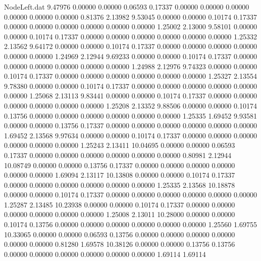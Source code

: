 \begin{filecontents}{NodeLeft.dat}
   9.47976    0.00000    0.00000     0.06593    0.17337    0.00000    0.00000    0.00000    0.00000    0.00000    0.00000    0.81376    2.13982
   9.53045    0.00000    0.00000     0.10174    0.17337    0.00000    0.00000    0.00000    0.00000    0.00000    0.00000    1.25002    2.13000
   9.58101    0.00000    0.00000     0.10174    0.17337    0.00000    0.00000    0.00000    0.00000    0.00000    0.00000    1.25332    2.13562
   9.64172    0.00000    0.00000     0.10174    0.17337    0.00000    0.00000    0.00000    0.00000    0.00000    0.00000    1.24969    2.12944
   9.69233    0.00000    0.00000     0.10174    0.17337    0.00000    0.00000    0.00000    0.00000    0.00000    0.00000    1.24988    2.12976
   9.74323    0.00000    0.00000     0.10174    0.17337    0.00000    0.00000    0.00000    0.00000    0.00000    0.00000    1.25327    2.13554
   9.78380    0.00000    0.00000     0.10174    0.17337    0.00000    0.00000    0.00000    0.00000    0.00000    0.00000    1.25068    2.13113
   9.83441    0.00000    0.00000     0.10174    0.17337    0.00000    0.00000    0.00000    0.00000    0.00000    0.00000    1.25208    2.13352
   9.88506    0.00000    0.00000     0.10174    0.13756    0.00000    0.00000    0.00000    0.00000    0.00000    0.00000    1.25335    1.69452
   9.93581    0.00000    0.00000     0.13756    0.17337    0.00000    0.00000    0.00000    0.00000    0.00000    0.00000    1.69452    2.13568
   9.97634    0.00000    0.00000     0.10174    0.17337    0.00000    0.00000    0.00000    0.00000    0.00000    0.00000    1.25243    2.13411
  10.04695    0.00000    0.00000     0.06593    0.17337    0.00000    0.00000    0.00000    0.00000    0.00000    0.00000    0.80981    2.12944
  10.08749    0.00000    0.00000     0.13756    0.17337    0.00000    0.00000    0.00000    0.00000    0.00000    0.00000    1.69094    2.13117
  10.13808    0.00000    0.00000     0.10174    0.17337    0.00000    0.00000    0.00000    0.00000    0.00000    0.00000    1.25335    2.13568
  10.18878    0.00000    0.00000     0.10174    0.17337    0.00000    0.00000    0.00000    0.00000    0.00000    0.00000    1.25287    2.13485
  10.23938    0.00000    0.00000     0.10174    0.17337    0.00000    0.00000    0.00000    0.00000    0.00000    0.00000    1.25008    2.13011
  10.28000    0.00000    0.00000     0.10174    0.13756    0.00000    0.00000    0.00000    0.00000    0.00000    0.00000    1.25560    1.69755
  10.33065    0.00000    0.00000     0.06593    0.13756    0.00000    0.00000    0.00000    0.00000    0.00000    0.00000    0.81280    1.69578
  10.38126    0.00000    0.00000     0.13756    0.13756    0.00000    0.00000    0.00000    0.00000    0.00000    0.00000    1.69114    1.69114

\end{filecontents}
